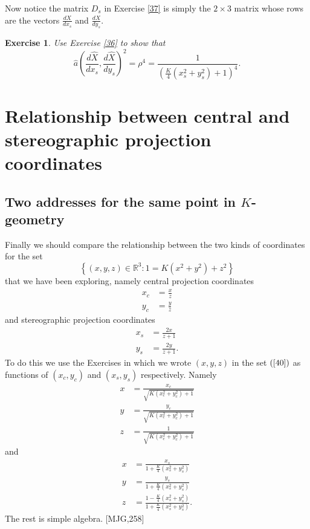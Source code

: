 \documentclass{article}%
\newtheorem{exercise}[theorem]{Exercise}
\begin{document}
Now notice the matrix $D_{s}$ in Exercise \ref{37} is simply the $2\times3$
matrix whose rows are the vectors $\frac{dX}{dx_{s}}$ and $\frac{dX}{dy_{s}}$.

\begin{exercise}
Use Exercise \ref{36} to show that%
\[
\hat{a}\left(  \frac{d\hat{X}}{dx_{s}},\frac{d\hat{X}}{dy_{s}}\right)
^{2}=\rho^{4}=\frac{1}{\left(  \frac{K}{4}\left(  x_{s}^{2}+y_{s}^{2}\right)
+1\right)  ^{4}}.
\]

\end{exercise}

\pagebreak\pagebreak

\section{Relationship between central and stereographic projection
coordinates}

\subsection{Two addresses for the same point in $K$-geometry}

Finally we should compare the relationship between the two kinds of
coordinates for the set%
\begin{equation}
\left\{  \left(  x,y,z\right)  \in\mathbb{R}^{3}:1=K\left(  x^{2}%
+y^{2}\right)  +z^{2}\right\}  \label{40}%
\end{equation}
that we have been exploring, namely central projection coordinates%
\begin{align}
x_{c}  &  =\frac{x}{z}\label{70}\\
y_{c}  &  =\frac{y}{z}\nonumber
\end{align}
and stereographic projection coordinates%
\begin{align}
x_{s}  &  =\frac{2x}{z+1}\label{71}\\
y_{s}  &  =\frac{2y}{z+1}.\nonumber
\end{align}
To do this we use the Exercises in which we wrote $\left(  x,y,z\right)  $ in
the set $\left(  \ref{40}\right)  $ as functions of $\left(  x_{c}%
,y_{c}\right)  $ and $\left(  x_{s},y_{s}\right)  $ respectively. Namely%
\begin{align*}
x  &  =\frac{x_{c}}{\sqrt{K\left(  x_{c}^{2}+y_{c}^{2}\right)  +1}}\\
y  &  =\frac{y_{c}}{\sqrt{K\left(  x_{c}^{2}+y_{c}^{2}\right)  +1}}\\
z  &  =\frac{1}{\sqrt{K\left(  x_{c}^{2}+y_{c}^{2}\right)  +1}}%
\end{align*}
and%
\begin{align*}
x  &  =\frac{x_{s}}{1+\frac{K}{4}\left(  x_{s}^{2}+y_{s}^{2}\right)  }\\
y  &  =\frac{y_{s}}{1+\frac{K}{4}\left(  x_{s}^{2}+y_{s}^{2}\right)  }\\
z  &  =\frac{1-\frac{K}{4}\left(  x_{s}^{2}+y_{s}^{2}\right)  }{1+\frac{K}%
{4}\left(  x_{s}^{2}+y_{s}^{2}\right)  }.
\end{align*}
The rest is simple algebra. [MJG,258]
\end{document}
